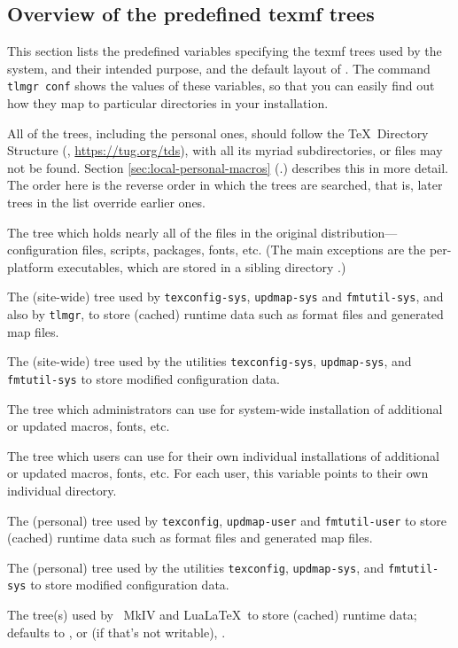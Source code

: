 \documentclass{article}
\begin{document}
\subsection{Overview of the predefined texmf trees}
\label{sec:texmftrees}

This section lists the predefined variables specifying the texmf trees
used by the system, and their intended purpose, and the default layout
of \TL{}. The command \texttt{tlmgr~conf} shows the values of these
variables, so that you can easily find out how they map to particular
directories in your installation.

All of the trees, including the personal ones, should follow the \TeX\
Directory Structure (\TDS, \url{https://tug.org/tds}), with all its
myriad subdirectories, or files may not be found.  Section
\ref{sec:local-personal-macros} (\p.\pageref{sec:local-personal-macros})
describes this in more detail.  The order here is the reverse order in
which the trees are searched, that is, later trees in the list override
earlier ones.

\begin{ttdescription}
\item [TEXMFDIST] The tree which holds nearly all of the files in the original
  distribution---configuration files, scripts, packages, fonts, etc.
  (The main exceptions are the per-platform executables, which are stored
  in a sibling directory \code{bin/}.)
\item [TEXMFSYSVAR] The (site-wide) tree used by \verb+texconfig-sys+,
  \verb+updmap-sys+ and \verb+fmtutil-sys+, and also by \verb+tlmgr+, to
  store (cached) runtime data such as format files and generated map files.
\item [TEXMFSYSCONFIG] The (site-wide) tree used by the utilities
  \verb+texconfig-sys+, \verb+updmap-sys+, and \verb+fmtutil-sys+ to
  store modified configuration data.
\item [TEXMFLOCAL] The tree which administrators can use for system-wide
  installation of additional or updated macros, fonts, etc.
\item [TEXMFHOME] The tree which users can use for their own individual
  installations of additional or updated macros, fonts, etc.
  For each user, this variable points to
  their own individual directory.
\item [TEXMFVAR] The (personal) tree used by \verb+texconfig+,
  \verb+updmap-user+ and \verb+fmtutil-user+ to store (cached) runtime data such
  as format files and generated map files.
\item [TEXMFCONFIG] The (personal) tree used by the utilities
  \verb+texconfig+, \verb+updmap-sys+, and \verb+fmtutil-sys+ to store modified
  configuration data.
\item [TEXMFCACHE] The tree(s) used by \ConTeXt\ MkIV and Lua\LaTeX\
  to store (cached) runtime data; defaults to ,
  or (if that's not writable), \code{TEXMFVAR}.
\end{ttdescription}
\end{document}
